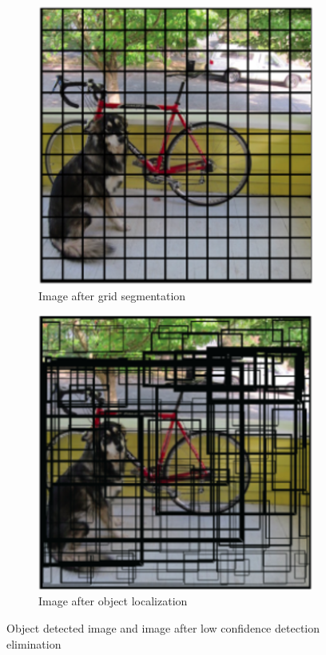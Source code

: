 \documentclass[conference]{IEEEtran}
\begin{document}
\begin{figure}[ht]
  \centering
  \begin{subfigure}[b]{0.45\linewidth}
    \includegraphics[width=\linewidth]{images/Picture34.png}
    \caption{Image after grid segmentation}
  \end{subfigure}
  \begin{subfigure}[b]{0.45\linewidth}
    \includegraphics[width=\linewidth]{images/Picture35.png}
    \caption{Image after object localization}
  \end{subfigure}
  \caption{Object detected image and image after low confidence detection elimination}
  \label{fig:combined11}
  \cite{b24}
\end{figure}
\end{document}
